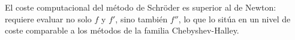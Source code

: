 El coste computacional del método de Schröder es superior al de Newton: requiere evaluar no solo $f$ y $f'$, sino también $f''$, lo que lo sitúa en un nivel de coste comparable a los métodos de la familia Chebyshev-Halley.







